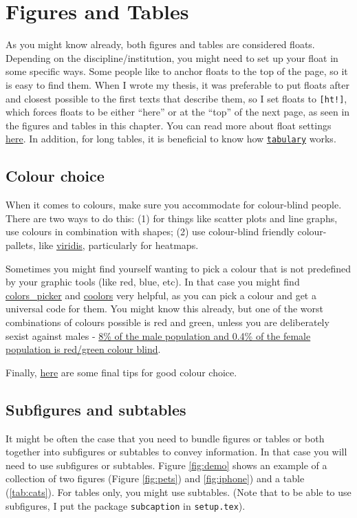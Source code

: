 \chapter{Figures and Tables}
As you might know already, both figures and tables are considered \glspl{float}. Depending on the discipline/institution, you might need to set up your float in some specific ways. Some people like to anchor floats to the top of the page, so it is easy to find them. When I wrote my thesis, it was preferable to put floats after and closest possible to the first texts that describe them, so I set floats to \texttt{[ht!]}, which forces floats to be either ``here'' or at the ``top'' of the next page, as seen in the figures and tables in this chapter. You can read more about float settings \href{https://www.overleaf.com/learn/latex/Positioning_of_Figures}{here}. In addition, for long tables, it is beneficial to know how \href{https://mirror.aarnet.edu.au/pub/CTAN/macros/latex/contrib/tabulary/tabulary.pdf}{\texttt{tabulary}} works.

\section{Colour choice}

When it comes to colours, make sure you accommodate for colour-blind people. There are two ways to do this: (1) for things like scatter plots and line graphs, use colours in combination with shapes; (2) use colour-blind friendly colour-pallets, like \href{https://cran.r-project.org/web/packages/viridis/vignettes/intro-to-viridis.html}{viridis}, particularly for heatmaps. 

Sometimes you might find yourself wanting to pick a colour that is not predefined by your graphic tools (like red, blue, etc). In that case you might find \href{https://www.w3schools.com/colors/colors\_picker.asp}{colors\_picker} and \href{https://coolors.co/URL}{coolors} very helpful, as you can pick a colour and get a universal code for them. You might know this already, but one of the worst combinations of colours possible is red and green, unless you are deliberately sexist against males - \href{https://visioneyeinstitute.com.au/eyematters/colour-blindness/}{8\% of the male population and 0.4\% of the female population is red/green colour blind}.

Finally, \href{https://betterfigures.org/2015/06/23/picking-a-colour-scale-for-scientific-graphics/}{here} are some final tips for good colour choice.

\section{Subfigures and subtables}

It might be often the case that you need to bundle figures or tables or both together into subfigures or subtables to convey information. In that case you will need to use subfigures or subtables. Figure \ref{fig:demo} shows an example of a collection of two figures (Figure \ref{fig:pets}) and \ref{fig:iphone}) and a table (\ref{tab:cats}). For tables only, you might use subtables. (Note that to be able to use subfigures, I put the package \texttt{subcaption} in \texttt{setup.tex}).



